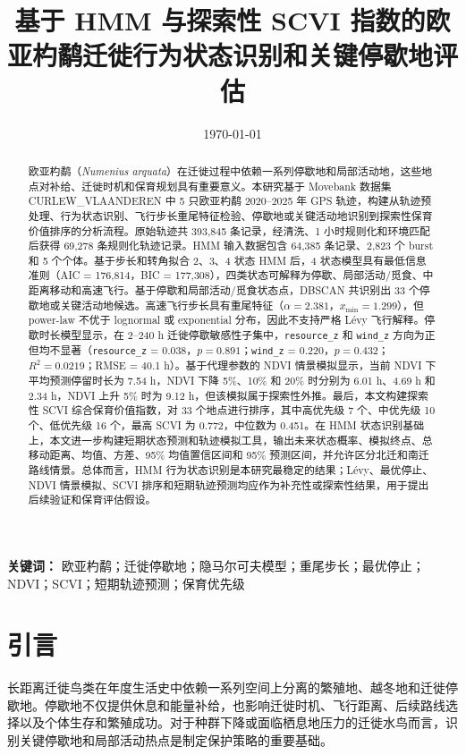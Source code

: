 \documentclass[UTF8,a4paper,12pt]{ctexart}
\title{\heiti 基于 HMM 与探索性 SCVI 指数的欧亚杓鹬迁徙行为状态识别和关键停歇地评估}
\author{}
\date{\today}
\begin{document}
\maketitle

\begin{abstract}
欧亚杓鹬（\textit{Numenius arquata}）在迁徙过程中依赖一系列停歇地和局部活动地，这些地点对补给、迁徙时机和保育规划具有重要意义。本研究基于 Movebank 数据集 CURLEW\_VLAANDEREN 中 5 只欧亚杓鹬 2020--2025 年 GPS 轨迹，构建从轨迹预处理、行为状态识别、飞行步长重尾特征检验、停歇地或关键活动地识别到探索性保育价值排序的分析流程。原始轨迹共 393,845 条记录，经清洗、1 小时规则化和环境匹配后获得 69,278 条规则化轨迹记录。HMM 输入数据包含 64,385 条记录、2,823 个 burst 和 5 个个体。基于步长和转角拟合 2、3、4 状态 HMM 后，4 状态模型具有最低信息准则（AIC = 176,814，BIC = 177,308），四类状态可解释为停歇、局部活动/觅食、中距离移动和高速飞行。基于停歇和局部活动/觅食状态点，DBSCAN 共识别出 33 个停歇地或关键活动地候选。高速飞行步长具有重尾特征（$\alpha = 2.381$，$x_{\min} = 1.299$），但 power-law 不优于 lognormal 或 exponential 分布，因此不支持严格 L\'evy 飞行解释。停歇时长模型显示，在 2--240 h 迁徙停歇敏感性子集中，\texttt{resource\_z} 和 \texttt{wind\_z} 方向为正但均不显著（\texttt{resource\_z} = 0.038，$p = 0.891$；\texttt{wind\_z} = 0.220，$p = 0.432$；$R^2 = 0.0219$；RMSE = 40.1 h）。基于代理参数的 NDVI 情景模拟显示，当前 NDVI 下平均预测停留时长为 7.54 h，NDVI 下降 5\%、10\% 和 20\% 时分别为 6.01 h、4.69 h 和 2.34 h，NDVI 上升 5\% 时为 9.12 h，但该模拟属于探索性外推。最后，本文构建探索性 SCVI 综合保育价值指数，对 33 个地点进行排序，其中高优先级 7 个、中优先级 10 个、低优先级 16 个，最高 SCVI 为 0.772，中位数为 0.451。在 HMM 状态识别基础上，本文进一步构建短期状态预测和轨迹模拟工具，输出未来状态概率、模拟终点、总移动距离、均值、方差、95\% 均值置信区间和 95\% 预测区间，并允许区分北迁和南迁路线情景。总体而言，HMM 行为状态识别是本研究最稳定的结果；L\'evy、最优停止、NDVI 情景模拟、SCVI 排序和短期轨迹预测均应作为补充性或探索性结果，用于提出后续验证和保育评估假设。
\end{abstract}

\noindent\textbf{关键词：} 欧亚杓鹬；迁徙停歇地；隐马尔可夫模型；重尾步长；最优停止；NDVI；SCVI；短期轨迹预测；保育优先级

\section{引言}

长距离迁徙鸟类在年度生活史中依赖一系列空间上分离的繁殖地、越冬地和迁徙停歇地。停歇地不仅提供休息和能量补给，也影响迁徙时机、飞行距离、后续路线选择以及个体生存和繁殖成功。对于种群下降或面临栖息地压力的迁徙水鸟而言，识别关键停歇地和局部活动热点是制定保护策略的重要基础。
\end{document}
